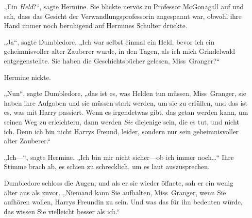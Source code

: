 „Ein \emph{Held}?“, sagte Hermine. Sie blickte nervös zu Professor McGonagall auf und sah, dass das Gesicht der Verwandlungsprofessorin angespannt war, obwohl ihre Hand immer noch beruhigend auf Hermines Schulter drückte.

„Ja“, sagte Dumbledore. „Ich war selbst einmal ein Held, bevor ich ein geheimnisvoller alter Zauberer wurde, in den Tagen, als ich mich Grindelwald entgegenstellte. Sie haben die Geschichtsbücher gelesen, Miss~Granger?“

Hermine nickte.

„Nun“, sagte Dumbledore, „das ist es, was Helden tun müssen, Miss~Granger, sie haben ihre Aufgaben und sie müssen stark werden, um sie zu erfüllen, und das ist es, was mit Harry passiert. Wenn es irgendetwas gibt, das getan werden kann, um seinen Weg zu erleichtern, dann werden \emph{Sie} diejenige sein, die es tut, und nicht ich. Denn ich bin nicht Harrys Freund, leider, sondern nur sein geheimnisvoller alter Zauberer.“

„Ich—“, sagte Hermine. „Ich bin mir nicht sicher—ob ich immer noch…“ Ihre Stimme brach ab, es schien zu schrecklich, um es laut auszusprechen.

Dumbledore schloss die Augen, und als er sie wieder öffnete, sah er ein wenig älter aus als zuvor. „Niemand kann Sie aufhalten, Miss~Granger, wenn Sie aufhören wollen, Harrys Freundin zu sein. Und was das für ihn bedeuten würde, das wissen Sie vielleicht besser als ich.“

